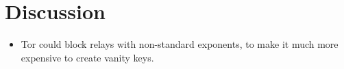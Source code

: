 \section{Discussion}
\label{sec:discussion}

\begin{itemize}
	\item Tor could block relays with non-standard exponents, to make it much
		more expensive to create vanity keys.
\end{itemize}
